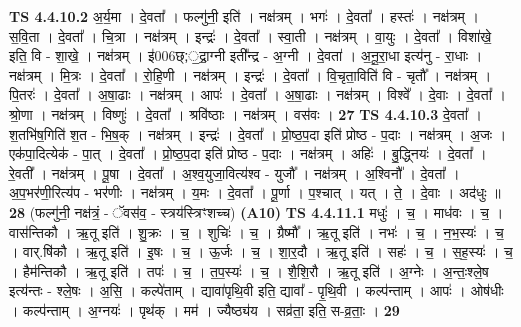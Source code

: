 \documentclass[17pt]{extarticle}
\begin{document}
                  \newline
                                \textbf{ TS 4.4.10.2} \newline
                  अ॒र्य॒मा । दे॒वता᳚ । फल्गु॑नी॒ इति॑ । नक्ष॑त्रम् । भगः॑ । दे॒वता᳚ । हस्तः॑ । नक्ष॑त्रम् । स॒वि॒ता । दे॒वता᳚ । चि॒त्रा । नक्ष॑त्रम् । इन्द्रः॑ । दे॒वता᳚ । स्वा॒ती । नक्ष॑त्रम् । वा॒युः । दे॒वता᳚ । विशा॑खे॒ इति॒ वि - शा॒खे॒ । नक्ष॑त्रम् । इ॑006छ्;॒द्रा॒ग्नी इती᳚न्द्र - अ॒ग्नी । दे॒वता॑ । अ॒नू॒रा॒धा इत्य॑नु - रा॒धाः । नक्ष॑त्रम् । मि॒त्रः । दे॒वता᳚ । रो॒हि॒णी । नक्ष॑त्रम् । इन्द्रः॑ । दे॒वता᳚ । वि॒चृता॒विति॑ वि - चृतौ᳚ । नक्ष॑त्रम् । पि॒तरः॑ । दे॒वता᳚ । अ॒षा॒ढाः । नक्ष॑त्रम् । आपः॑ । दे॒वता᳚ । अ॒षा॒ढाः । नक्ष॑त्रम् । विश्वे᳚ । दे॒वाः । दे॒वता᳚ । श्रो॒णा । नक्ष॑त्रम् । विष्णुः॑ । दे॒वता᳚ । श्रवि॑ष्ठाः । नक्ष॑त्रम् । वस॑वः । \textbf{  27} \newline
                  \newline
                                \textbf{ TS 4.4.10.3} \newline
                  दे॒वता᳚ । श॒तभि॑ष॒गिति॑ श॒त - भि॒ष॒क् । नक्ष॑त्रम् । इन्द्रः॑ । दे॒वता᳚ । प्रो॒ष्ठ॒प॒दा इति॑ प्रोष्ठ - प॒दाः । नक्ष॑त्रम् । अ॒जः । एक॑पा॒दित्येक॑ - पा॒त् । दे॒वता᳚ । प्रो॒ष्ठ॒प॒दा इति॑ प्रोष्ठ - प॒दाः । नक्ष॑त्रम् । अहिः॑ । बु॒द्ध्नियः॑ । दे॒वता᳚ । रे॒वती᳚ । नक्ष॑त्रम् । पू॒षा । दे॒वता᳚ । अ॒श्व॒युजा॒वित्य॑श्व - युजौ᳚ । नक्ष॑त्रम् । अ॒श्विनौ᳚ । दे॒वता᳚ । अ॒प॒भर॑णी॒रित्य॑प - भर॑णीः । नक्ष॑त्रम् । य॒मः । दे॒वता᳚ । पू॒र्णा । प॒श्चात् । यत् । ते॒ । दे॒वाः । अद॑धुः ॥ \textbf{  28} \newline
                  \newline
                      (फल्गु॑नी॒ नक्ष॑त्रं॒ - ॅवस॑व॒ - स्त्रय॑स्त्रिꣳशच्च)  \textbf{(A10)} \newline \newline
                                \textbf{ TS 4.4.11.1} \newline
                  मधुः॑ । च॒ । माध॑वः । च॒ । वास॑न्तिकौ । ऋ॒तू इति॑ । शु॒क्रः । च॒ । शुचिः॑ । च॒ । ग्रैष्मौ᳚ । ऋ॒तू इति॑ । नभः॑ । च॒ । न॒भ॒स्यः॑ । च॒ । वार्.षि॑कौ । ऋ॒तू इति॑ । इ॒षः । च॒ । ऊ॒र्जः । च॒ । शा॒र॒दौ । ऋ॒तू इति॑ । सहः॑ । च॒ । स॒ह॒स्यः॑ । च॒ । हैम॑न्तिकौ । ऋ॒तू इति॑ । तपः॑ । च॒ । त॒प॒स्यः॑ । च॒ । शै॒शि॒रौ । ऋ॒तू इति॑ । अ॒ग्नेः । अ॒न्तः॒श्ले॒ष इत्य॑न्तः - श्ले॒षः । अ॒सि॒ । कल्पे॑ताम् । द्यावा॑पृथि॒वी इति॒ द्यावा᳚ - पृ॒थि॒वी । कल्प॑न्ताम् । आपः॑ । ओष॑धीः । कल्प॑न्ताम् । अ॒ग्नयः॑ । पृथ॑क् । मम॑ । ज्यैष्ठ्य॑य । सव्र॑ता॒ इति॒ स-व्र॒ताः॒ । \textbf{  29} \newline
                  \newline
\end{document}
